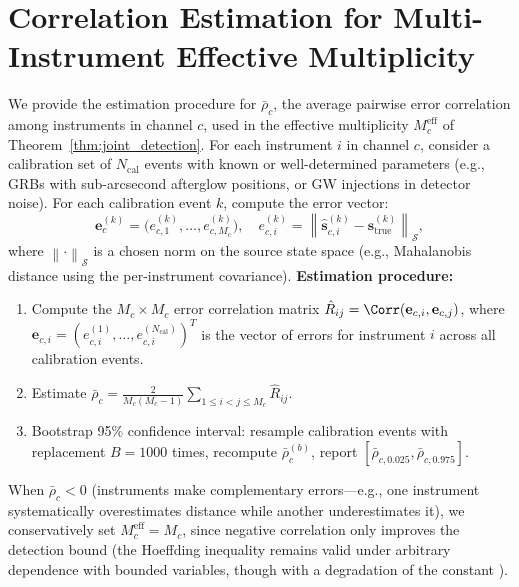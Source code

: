 \documentclass[11pt,a4paper]{article}
\theoremstyle{definition}
\newcommand{\norm}[1]{\left\lVert#1\right\rVert}
\begin{document}
\section{Correlation Estimation for Multi-Instrument Effective Multiplicity}
\label{sec:app_correlation}
We provide the estimation procedure for $\bar{\rho}_c$, the average pairwise error correlation among instruments in channel $c$, used in the effective multiplicity $M_c^{\mathrm{eff}}$ of Theorem~\ref{thm:joint_detection}.
For each instrument $i$ in channel $c$, consider a calibration set of $N_{\mathrm{cal}}$ events with known or well-determined parameters (e.g., GRBs with sub-arcsecond afterglow positions, or GW injections in detector noise). For each calibration event $k$, compute the error vector:
\begin{equation}
\mathbf{e}_c^{(k)} = \bigl(e_{c,1}^{(k)}, \ldots, e_{c,M_c}^{(k)}\bigr), \quad e_{c,i}^{(k)} = \norm{\hat{\mathbf{s}}_{c,i}^{(k)} - \mathbf{s}_{\mathrm{true}}^{(k)}}_{\mathcal{S}},
\end{equation}
where $\norm{\cdot}_{\mathcal{S}}$ is a chosen norm on the source state space (e.g., Mahalanobis distance using the per-instrument covariance).
\textbf{Estimation procedure:}
\begin{enumerate}[label=(\roman*)]
    \item Compute the $M_c \times M_c$ error correlation matrix $\hat{R}_{ij} = \Corr(\mathbf{e}_{c,i}, \mathbf{e}_{c,j})$, where $\mathbf{e}_{c,i} = (e_{c,i}^{(1)}, \ldots, e_{c,i}^{(N_{\mathrm{cal}})})^T$ is the vector of errors for instrument $i$ across all calibration events.
    \item Estimate $\bar{\rho}_c = \frac{2}{M_c(M_c-1)}\sum_{1 \leq i < j \leq M_c} \hat{R}_{ij}$.
    \item Bootstrap 95\% confidence interval: resample calibration events with replacement $B = 1000$ times, recompute $\bar{\rho}_c^{(b)}$, report $[\bar{\rho}_{c, 0.025}, \bar{\rho}_{c, 0.975}]$.
\end{enumerate}
When $\bar{\rho}_c < 0$ (instruments make complementary errors---e.g., one instrument systematically overestimates distance while another underestimates it), we conservatively set $M_c^{\mathrm{eff}} = M_c$, since negative correlation only improves the detection bound (the Hoeffding inequality remains valid under arbitrary dependence with bounded variables, though with a degradation of the constant \cite{Wainwright2019}).
\end{document}
